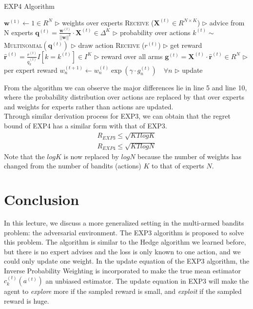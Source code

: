 \documentclass[11pt]{article}
\begin{document}
\begin{algorithm}[H]
\caption{EXP4 Algorithm}
\label{algo:exp4}
\begin{algorithmic}[1]
\State $\pmb{w}^{(1)} \leftarrow 1 \in R^N$ \hfill $\triangleright$ weights over experts
\State \textsc{Receive} ($\pmb{X}^{(t)}\in R^{N \times K}$) \hfill $\triangleright$ advice from N experts
\State $\pmb{q}^{(t)} = \frac{\pmb{w}^{(t)}}{||\pmb{w}||^2} \cdot \pmb{X}^{(t)} \in \Delta^K$ \hfill $\triangleright$ probability over actions
\State $k^{(t)} \sim $\textsc{Multinomial}$(\pmb{q}^{(t)})$ \hfill $\triangleright$ draw action
\State \textsc{Receive} ($r^{(t)}$) \hfill $\triangleright$ get reward
\State $\pmb{\hat{r}}^{(t)} = \frac{r^{(t)}}{q^{(t)}_k} I [k = k^{(t)}] \in I^K$ \hfill $\triangleright$ reward over all arms
\State $\pmb{g}^{(t)} = \pmb{X}^{(t)} \cdot \pmb{\hat{r}}^{(t)} \in R^N $ \hfill $\triangleright$ per expert reward
\State $w_{n}^{(t+1)}\leftarrow w_{n}^{(t)} \exp{(\gamma \cdot g_n^{(t)})} \quad \forall n$ \hfill $\triangleright$ update
\EndFor
\EndFunction
\end{algorithmic}
\end{algorithm}

From the algorithm we can observe the major differences lie in line 5 and line 10, where the probability distribution over actions are replaced by that over experts and weights for experts rather than actions are updated. \\
Through similar derivation process for EXP3, we can obtain that the regret bound of EXP4 has a similar form with that of EXP3.
\begin{align}
    R_{EXP3} \leq \sqrt{KTlogK}\\
    R_{EXP4} \leq \sqrt{KTlogN}
\end{align}
Note that the $logK$ is now replaced by $logN$ because the number of weights has changed from the number of bandits (actions) $K$ to that of experts $N$.

\vspace{-5mm}
\section{Conclusion}
\vspace{-3mm}
In this lecture, we discuss a more generalized setting in the multi-armed bandits problem: the adversarial environment. The EXP3 algorithm is proposed to solve this problem. The algorithm is similar to the Hedge algorithm we learned before, but there is no expert advises and the loss is only known to one action, and we could only update one weight. In the update equation of the EXP3 algorithm, the Inverse Probability Weighting is incorporated to make the true mean estimator $c_k^{(t)}(a^{(t)})$ an unbiased estimator. The update equation in EXP3 will make the agent to \textit{explore} more if the sampled reward is small, and \textit{exploit} if the sampled reward is huge.
\end{document}
